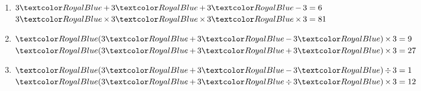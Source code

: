 \begin{Maquette}[Fiche,CorrigeFin,Colonnes=2]{}
\begin{multicols}{2}
      \begin{Solution}
         \begin{enumerate}
            \item $3 \cor{\,+\,} 3 \cor{\,+\,} 3 \cor{\,-\,} 3 = 6$ \\
               $3 \cor{\,\times\,} 3  \cor{\,\times\,} 3  \cor{\,\times\,} 3 = 81$ \smallskip
            \item $\cor{(} 3 \cor{\,+\,} 3 \cor{\,-\,} 3 \cor{)\,\times\,} 3 = 9$ \\
               $\cor{(} 3 \cor{\,+\,} 3 \cor{\,+\,} 3 \cor{)\,\times\,} 3 = 27$ \smallskip
            \item $\cor{(} 3 \cor{\,+\,} 3 \cor{\,-\,} 3 \cor{)\,\div\,} 3 = 1$ \\
               $\cor{(} 3 \cor{\,+\,} 3 \cor{\,\div\,} 3 \cor{)\,\times\,} 3 = 12$
         \end{enumerate}
      \end{Solution}

   \end{multicols}

\end{Maquette}


